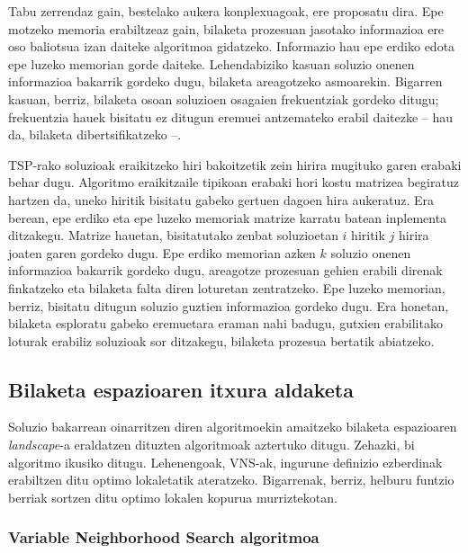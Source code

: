 \documentclass[eu]{ifirak}\usepackage[]{graphicx}\usepackage[]{color}
\begin{document}
Tabu zerrendaz gain, bestelako aukera konplexuagoak, ere proposatu dira. Epe motzeko memoria erabiltzeaz gain, bilaketa prozesuan jasotako informazioa ere oso baliotsua izan daiteke algoritmoa gidatzeko. Informazio hau epe erdiko edota epe luzeko memorian gorde daiteke. Lehendabiziko kasuan soluzio onenen informazioa bakarrik gordeko dugu, bilaketa areagotzeko asmoarekin. Bigarren kasuan, berriz, bilaketa osoan soluzioen osagaien frekuentziak gordeko ditugu; frekuentzia hauek bisitatu ez ditugun eremuei antzemateko erabil daitezke -- hau da, bilaketa dibertsifikatzeko --.


\begin{tcolorbox}
\begin{ifexample}
TSP-rako soluzioak eraikitzeko hiri bakoitzetik zein hirira mugituko garen erabaki behar dugu. Algoritmo eraikitzaile tipikoan erabaki hori kostu matrizea begiratuz hartzen da, uneko hiritik bisitatu gabeko gertuen dagoen hira aukeratuz. Era berean, epe erdiko eta epe luzeko memoriak matrize karratu batean inplementa ditzakegu. Matrize hauetan, bisitatutako zenbat soluzioetan $i$ hiritik $j$ hirira joaten garen gordeko dugu. Epe erdiko memorian azken $k$ soluzio onenen informazioa bakarrik gordeko dugu, areagotze prozesuan gehien erabili direnak finkatzeko eta bilaketa falta diren loturetan zentratzeko. Epe luzeko memorian, berriz, bisitatu ditugun soluzio guztien informazioa gordeko dugu. Era honetan, bilaketa esploratu gabeko eremuetara eraman nahi badugu, gutxien erabilitako loturak erabiliz soluzioak sor ditzakegu, bilaketa prozesua bertatik abiatzeko.
\end{ifexample}
\end{tcolorbox}

\subsection{Bilaketa espazioaren itxura aldaketa}

Soluzio bakarrean oinarritzen diren algoritmoekin amaitzeko bilaketa espazioaren \textit{landscape}-a eraldatzen dituzten algoritmoak aztertuko ditugu. Zehazki, bi algoritmo ikusiko ditugu. Lehenengoak, VNS-ak, ingurune definizio ezberdinak erabiltzen ditu optimo lokaletatik ateratzeko. Bigarrenak, berriz, helburu funtzio berriak sortzen ditu optimo lokalen kopurua murriztekotan.

\subsubsection{Variable Neighborhood Search algoritmoa}
\end{document}

